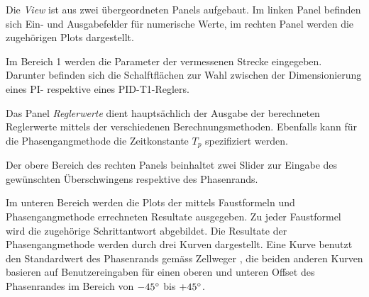 Die  \emph{View} ist  aus  zwei \"ubergeordneten  Panels aufgebaut. Im  linken
Panel befinden sich Ein- und  Ausgabefelder f\"ur numerische Werte, im rechten
Panel werden die zugeh\"origen Plots dargestellt.



Im  Bereich 1    werden die  Parameter der  vermessenen
Strecke  eingegeben. Darunter  befinden  sich die  Schalftfl\"achen  zur  Wahl
  zwischen der  Dimensionierung eines
PI- respektive eines PID-T1-Reglers.

Das Panel \emph{Reglerwerte} dient haupts\"achlich der Ausgabe der berechneten
Reglerwerte  mittels  der  verschiedenen  Berechnungsmethoden. Ebenfalls  kann
f\"ur  die Phasengangmethode  die Zeitkonstante  $T_p$  spezifiziert werden.  

Der obere Bereich des rechten Panels beinhaltet zwei Slider zur Eingabe des
gew\"unschten \"Uberschwingens respektive des Phasenrands.

Im   unteren  Bereich   werden  die   Plots  der   mittels  Faustformeln   und
Phasengangmethode  errechneten  Resultate   ausgegeben. Zu  jeder  Faustformel
wird   die   zugeh\"orige   Schrittantwort   abgebildet. Die   Resultate   der
Phasengangmethode  werden durch  drei Kurven  dargestellt. Eine Kurve  benutzt
den  Standardwert des  Phasenrands gem\"ass  Zellweger , die beiden anderen Kurven basieren auf Benutzereingaben f\"ur einen
oberen und  unteren Offset  des Phasenrandes im  Bereich von  $-45\degree$ bis
$+45\degree$.
